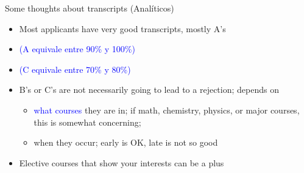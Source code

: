 \begin{frame}[fragile]{Some thoughts about transcripts \textcolor{yellow!80!black}{(Anal\'iticos)}}

    \begin{itemize}
        \item Most applicants have very good transcripts, mostly A's
        \item \textcolor{blue}{(A equivale entre 90\% y 100\%)}
        \item \textcolor{blue}{(C equivale entre 70\% y 80\%)}
        \item B's or C's are not necessarily going to lead to a rejection; depends on 
        \begin{itemize}
            \item \textcolor{blue}{what courses} they are in; if math, chemistry, physics, or major courses, this is somewhat concerning; 
            \item \textcolor{green!60!black}{when} they occur; early is OK, late is not so good
        \end{itemize}
        \item Elective courses that show your interests can be a plus
    \end{itemize}
\end{frame}

